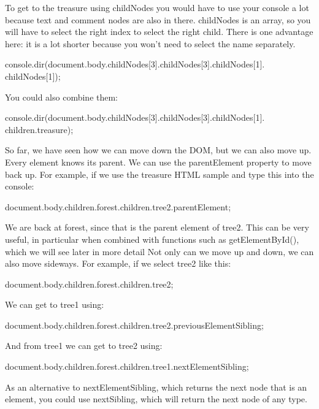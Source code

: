 \documentclass{report}
\begin{document}
\begin{jscode}
    \bigbreak \noindent 
    To get to the treasure using childNodes you would have to use your console a lot
    because text and comment nodes are also in there. childNodes is an array, so you will
    have to select the right index to select the right child. There is one advantage here: it
    is a lot shorter because you won't need to select the name separately.
    \bigbreak \noindent 
    \begin{jscode}
    console.dir(document.body.childNodes[3].childNodes[3].childNodes[1]. childNodes[1]);
    \end{jscode}
    \bigbreak \noindent 
    You could also combine them:
    \bigbreak \noindent 
    \begin{jscode}
    console.dir(document.body.childNodes[3].childNodes[3].childNodes[1]. children.treasure);
    \end{jscode}
    \bigbreak \noindent 
    So far, we have seen how we can move down the DOM, but we can also move up. Every element knows its parent. We can use the parentElement property to move back up. For example, if we use the treasure HTML sample and type this into the console:
    \begin{jscode}
        document.body.children.forest.children.tree2.parentElement;
    \end{jscode}
    \bigbreak \noindent 
    We are back at forest, since that is the parent element of tree2. This can be very
useful, in particular when combined with functions such as getElementById(),
which we will see later in more detail
\bigbreak \noindent 
Not only can we move up and down, we can also move sideways. For example, if
we select tree2 like this:
\begin{jscode}
    document.body.children.forest.children.tree2;
\end{jscode}
\bigbreak \noindent 
We can get to tree1 using:
\bigbreak \noindent 
\begin{jscode}
document.body.children.forest.children.tree2.previousElementSibling;
\end{jscode}
\bigbreak \noindent 
And from tree1 we can get to tree2 using:
\bigbreak \noindent 
\begin{jscode}
document.body.children.forest.children.tree1.nextElementSibling;
\end{jscode}
\bigbreak \noindent 
As an alternative to nextElementSibling, which returns the next node that is an
element, you could use nextSibling, which will return the next node of any type.

\bigbreak \noindent 

\end{jscode}
\end{document}
